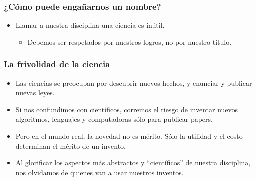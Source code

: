 \documentclass[spanish]{beamer}
\begin{document}
\begin{frame}
  \frametitle{¿Cómo puede engañarnos un nombre?}

  \begin{itemize}
    \item Llamar a nuestra disciplina una ciencia es inútil.

    \pause

    \begin{itemize}
      \item Debemos ser respetados por nuestros logros, no por nuestro título.
    \end{itemize}
  \end{itemize}
\end{frame}


\begin{frame}
  \frametitle{La frivolidad de la ciencia}

  \pause

  \begin{itemize}
    \item Las ciencias se preocupan por descubrir nuevos hechos, y enunciar y
      publicar nuevas leyes.

    \pause

    \item Si nos confundimos con científicos, corremos el riesgo de inventar
      nuevos algoritmos, lenguajes y computadoras sólo para publicar papers.

    \pause

    \item Pero en el mundo real, la novedad no es mérito. Sólo la utilidad y el
      costo determinan el mérito de un invento.

    \pause

    \item Al glorificar los aspectos más abstractos y ``científicos'' de
      nuestra disciplina, nos olvidamos de quienes van a usar nuestros
      inventos.
  \end{itemize}
\end{frame}
\end{document}
